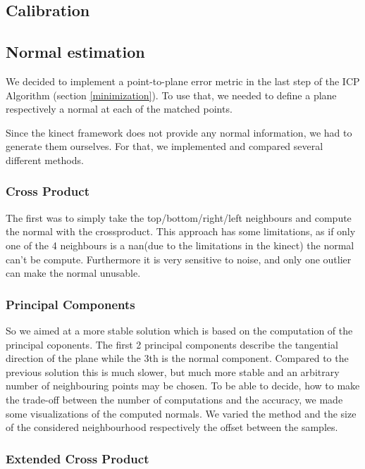 \documentclass[10pt,twocolumn,letterpaper]{article}
\begin{document}
\subsection{Calibration}

\subsection{Normal estimation}

We decided to implement a point-to-plane error metric in the last step of the ICP Algorithm (section \ref{minimization}). To use that, we needed to define a plane respectively a normal at each of the matched points.

Since the kinect framework does not provide any normal information, we had to generate them ourselves. For that, we implemented and compared several different methods.

\subsubsection{Cross Product}
The first was to simply take the top/bottom/right/left neighbours and compute the normal with the crossproduct.
This approach has some limitations, as if only one of the 4 neighbours is a nan(due to the limitations in the kinect) the normal can't be compute. Furthermore it is very sensitive to noise, and only one outlier can make the normal unusable.

\subsubsection{Principal Components}
So we aimed at a more stable solution which is based on the computation of the principal coponents. 
The first 2 principal components describe the tangential direction of the plane while the 3th is the normal component.
Compared to the previous solution this is much slower, but much more stable and an arbitrary number of neighbouring points may be chosen.
To be able to decide, how to make the trade-off between the number of computations and the accuracy, we made some visualizations of the computed normals.
We varied the method and the size of the considered neighbourhood respectively the offset between the samples.

\subsubsection{Extended Cross Product}
\end{document}
